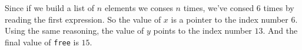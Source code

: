 \documentclass[a4paper,12pt]{article}
\begin{document}
Since if we build a list of $n$ elements we conses $n$ times, we've
consed $6$ times by reading the first expression.  So the value of $x$
is a pointer to the index number $6$.  Using the same reasoning, the
value of $y$ points to the index number $13$.  And the final value of
\lstinline!free! is $15$.
\end{document}
